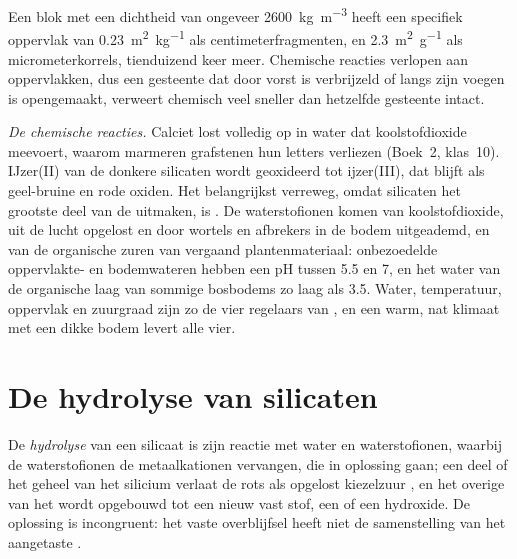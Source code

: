 Een blok  met een dichtheid van ongeveer \qty{2600}{kg.m^{-3}} heeft een specifiek oppervlak van \qty{0.23}{m^2.kg^{-1}} als centimeterfragmenten, en \qty{2.3}{m^2.g^{-1}} als micrometerkorrels, tienduizend keer meer. Chemische reacties verlopen aan oppervlakken, dus een gesteente dat door vorst is verbrijzeld of langs zijn voegen is opengemaakt, verweert chemisch veel sneller dan hetzelfde gesteente intact.

\emph{De chemische reacties.} Calciet lost volledig op in water dat koolstofdioxide meevoert, waarom marmeren grafstenen hun letters verliezen (Boek~2, klas~10). IJzer(II) van de donkere silicaten wordt geoxideerd tot ijzer(III), dat blijft als geel-bruine en rode oxiden. Het belangrijkst verreweg, omdat silicaten het grootste deel van de  uitmaken, is . De waterstofionen komen van koolstofdioxide, uit de lucht opgelost en door wortels en afbrekers in de bodem uitgeademd, en van de organische zuren van vergaand plantenmateriaal: onbezoedelde oppervlakte- en bodemwateren hebben een pH tussen 5.5 en 7, en het water van de organische laag van sommige bosbodems zo laag als 3.5. Water, temperatuur, oppervlak en zuurgraad zijn zo de vier regelaars van , en een warm, nat klimaat met een dikke bodem levert alle vier.

\section{De hydrolyse van silicaten}\label{sec:b1:weathering-clays:hydrolysis}

\begin{definition}\label{def:b1:weathering-clays:hydrolysis}
De \emph{hydrolyse} van een silicaat is zijn reactie met water en waterstofionen, waarbij de waterstofionen de metaalkationen vervangen, die in oplossing gaan; een deel of het geheel van het silicium verlaat de rots als opgelost kiezelzuur , en het overige van het  wordt opgebouwd tot een nieuw vast stof, een  of een hydroxide. De oplossing is incongruent: het vaste overblijfsel heeft niet de samenstelling van het aangetaste .
\end{definition}

